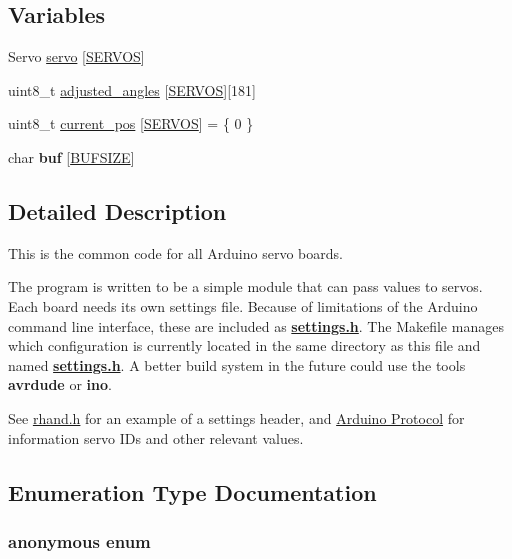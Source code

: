 \subsection*{Variables}
\begin{DoxyCompactItemize}
\item 
Servo \hyperlink{servo_8ino_adf02be48d17da3f4a229ebfdfda2fa71}{servo} \mbox{[}\hyperlink{settings_8h_a7baed4559391f95790fea2b456a22b68}{S\+E\+R\+V\+O\+S}\mbox{]}
\item 
uint8\+\_\+t \hyperlink{servo_8ino_afb7b19d5ec5c1046df4a261ca4ee9f70}{adjusted\+\_\+angles} \mbox{[}\hyperlink{settings_8h_a7baed4559391f95790fea2b456a22b68}{S\+E\+R\+V\+O\+S}\mbox{]}\mbox{[}181\mbox{]}
\item 
uint8\+\_\+t \hyperlink{servo_8ino_ae88c6e452cc6a2dc7af59897c42d8e1e}{current\+\_\+pos} \mbox{[}\hyperlink{settings_8h_a7baed4559391f95790fea2b456a22b68}{S\+E\+R\+V\+O\+S}\mbox{]} = \{ 0 \}
\item 
\hypertarget{servo_8ino_ac95651d79c608a3148973b5b1fc9e525}{}char {\bfseries buf} \mbox{[}\hyperlink{settings_8h_aeca034f67218340ecb2261a22c2f3dcd}{B\+U\+F\+S\+I\+Z\+E}\mbox{]}\label{servo_8ino_ac95651d79c608a3148973b5b1fc9e525}

\end{DoxyCompactItemize}


\subsection{Detailed Description}
This is the common code for all Arduino servo boards.

The program is written to be a simple module that can pass values to servos. Each board needs its own settings file. Because of limitations of the Arduino command line interface, these are included as {\bfseries \hyperlink{settings_8h}{settings.\+h}}. The Makefile manages which configuration is currently located in the same directory as this file and named {\bfseries \hyperlink{settings_8h}{settings.\+h}}. A better build system in the future could use the tools {\bfseries avrdude} or {\bfseries ino}.

See \hyperlink{rhand_8h}{rhand.\+h} for an example of a settings header, and \hyperlink{index_Arduino}{Arduino Protocol} for information servo I\+Ds and other relevant values. 

\subsection{Enumeration Type Documentation}
\hypertarget{servo_8ino_a99fb83031ce9923c84392b4e92f956b5}{}\subsubsection[{anonymous enum}]{\setlength{\rightskip}{0pt plus 5cm}anonymous enum}\label{servo_8ino_a99fb83031ce9923c84392b4e92f956b5}


